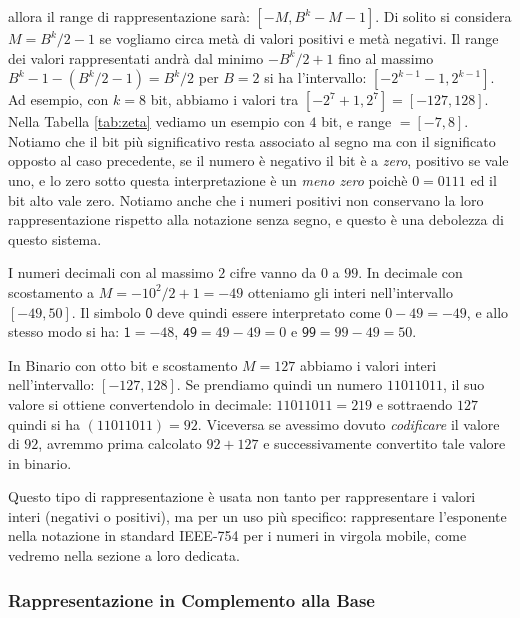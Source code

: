 \noindent allora il range di rappresentazione sarà: $[-M,B^k-M-1]$. Di solito
si considera $M = B^k/2-1$ se vogliamo circa metà di valori positivi e metà
negativi. Il range dei valori rappresentati andrà dal minimo $-B^k/2+1$ fino al
massimo $B^k-1-(B^k/2-1) = B^k/2$ per $B=2$ si ha l'intervallo:
$[-2^{k-1}-1,2^{k-1}]$. Ad esempio, con $k = 8$ bit, abbiamo i valori tra
$[-2^7+1,2^7] = [-127,128]$. Nella Tabella \ref{tab:zeta} vediamo un esempio con $4$
bit, e range $= [-7,8]$. Notiamo che il bit più significativo resta associato
al segno ma con il significato opposto al caso precedente, se il numero è
negativo il bit è a \emph{zero}, positivo se vale uno, e lo zero sotto questa
interpretazione è un \emph{meno zero} poichè $0 = 0111$ ed il bit alto vale
zero. Notiamo anche che i numeri positivi non conservano la loro
rappresentazione rispetto alla notazione senza segno, e questo è una debolezza
di questo sistema.


\begin{ex} I numeri decimali con al massimo $2$ cifre vanno da $0$ a $99$. In decimale con scostamento a $M = -10^2/2 + 1 = -49$ otteniamo gli interi nell'intervallo $[-49,50]$. Il simbolo $\mathsf 0$ deve quindi essere interpretato come $0-49 = -49$, e allo stesso modo si ha: $\mathsf{1} = -48$, $\mathsf{49} = 49 - 49 = 0$ e $\mathsf{99} = 99 - 49 = 50$.

In Binario con otto bit e scostamento $M = 127$ abbiamo i valori interi nell'intervallo: $[-127,128]$. Se prendiamo quindi un numero $11011011$, il suo valore si ottiene convertendolo in decimale:
$11011011 = 219$ e sottraendo $127$ quindi si ha $(11011011) = 92$. Viceversa se avessimo dovuto \emph{codificare} il valore di $92$, avremmo prima calcolato $92+127$ e successivamente convertito tale valore in binario.
\end{ex}

Questo tipo di rappresentazione è usata non tanto per rappresentare i valori interi (negativi o positivi), ma per un uso più specifico: rappresentare l'esponente nella notazione in standard \textrm{IEEE-754} per i numeri in virgola mobile, come vedremo nella sezione a loro dedicata.

\subsubsection{Rappresentazione in Complemento alla Base}


